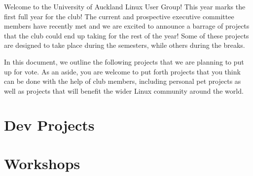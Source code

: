 \documentclass[11pt,fleqn]{article}
\begin{document}
\newpage

Welcome to the University of Auckland Linux User Group!  This year marks the first full year for the club!  The current and prospective executive committee members have recently met and we are excited to announce a barrage of projects that the club could end up taking for the rest of the year!  Some of these projects are designed to take place during the semesters, while others during the breaks.

In this document, we outline the following projects that we are planning to put up for vote.  As an aside, you are welcome to put forth projects that you think can be done with the help of club members, including personal pet projects as well as projects that will benefit the wider Linux community around the world.

\begin{spacing}{1.45}
    \tableofcontents
\end{spacing}

\newpage

\section{Dev Projects}



\newpage



\newpage



\newpage



\newpage



\newpage



\newpage



\newpage



\newpage

\section{Workshops}
\end{document}
